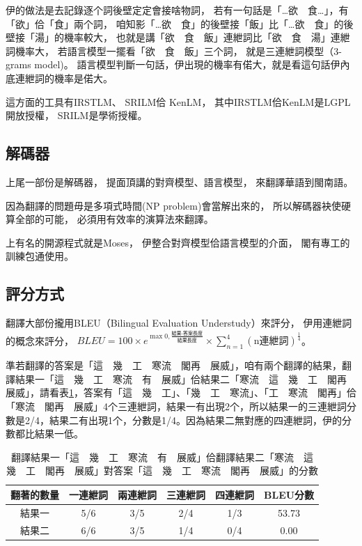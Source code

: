伊的做法是去記錄逐个詞後壁定定會接啥物詞，
若有一句話是「…欲　食…」，有「欲」佮「食」兩个詞，
咱知影「…欲　食」的後壁接「飯」比「…欲　食」的後壁接「湯」的機率較大，
也就是講「欲　食　飯」連紲詞比「欲　食　湯」連紲詞機率大，
若語言模型一擺看「欲　食　飯」三个詞，
就是三連紲詞模型（3-grams model)。
語言模型判斷一句話，伊出現的機率有偌大，就是看這句話伊內底連紲詞的機率是偌大。

這方面的工具有IRSTLM\cite{federico2008irstlm}、
SRILM\cite{stolcke2002srilm}佮
KenLM\cite{Heafield-estimate}，
其中IRSTLM佮KenLM是LGPL開放授權，
SRILM是學術授權。

\subsection{解碼器}
\label{小節：解碼器}
上尾一部份是解碼器，
提面頂講的對齊模型、語言模型，
來翻譯華語到閩南語。

因為翻譯的問題毋是多項式時間(NP problem)會當解出來的，
所以解碼器袂使硬算全部的可能，
必須用有效率的演算法來翻譯。

上有名的開源程式就是Moses\cite{Koehn:2007:MOS:1557769.1557821}，
伊整合對齊模型佮語言模型的介面，
閣有專工的訓練包通使用\cite{Moses訓練包}。

\subsection{評分方式}
\label{小節：評分方式}

翻譯大部份攏用BLEU（Bilingual Evaluation Understudy）來評分，
伊用連紲詞的概念來評分，
$BLEU=100\times{e^{\max{0,\frac{\textit{結果-答案長度}}{\textit{結果長度}}}}}\times{\sum_{n=1}^{4}(\textrm{n連紲詞})^{\frac{1}{4}}}$\cite{BLEU程式}。

準若翻譯的答案是「這　幾　工　寒流　閣再　展威」，咱有兩个翻譯的結果，翻譯結果一「這　幾　工　寒流　有　展威」佮結果二「寒流　這　幾　工　閣再　展威」，請看表\ref{表：範例BLEU分數}，答案有「這　幾　工」、「幾　工　寒流」、「工　寒流　閣再」佮「寒流　閣再　展威」4个三連紲詞，結果一有出現2个，所以結果一的三連紲詞分數是2/4，結果二有出現1个，分數是1/4。因為結果二無對應的四連紲詞，伊的分數都比結果一低。

\begin{table}
\caption{翻譯結果一「這　幾　工　寒流　有　展威」佮翻譯結果二「寒流　這　幾　工　閣再　展威」對答案「這　幾　工　寒流　閣再　展威」的分數}%
\label{表：範例BLEU分數}
\centering
\begin{tabular}{|c|cccc|c|}
\hline
翻著的數量 & 一連紲詞 & 兩連紲詞 & 三連紲詞 & 四連紲詞 & BLEU分數\\
\hline
結果一 & 5/6 & 3/5 & 2/4 & 1/3 & 53.73\\
\hline
結果二 & 6/6 & 3/5 & 1/4 & 0/4 & 0.00\\
\hline
\end{tabular}
\end{table}


